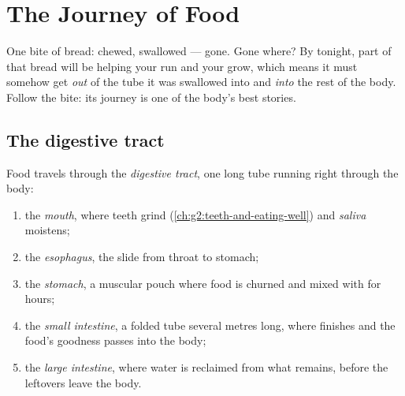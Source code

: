\chapter{The Journey of Food}\label{ch:g4:journey-of-food}

One bite of bread: chewed, swallowed --- gone. Gone where? By
tonight, part of that bread will be helping your  run and
your  grow, which means it must somehow get \emph{out} of
the tube it was swallowed into and \emph{into} the rest of the
body. Follow the bite: its journey is one of the body's best
stories.

\section{The digestive tract}

\begin{definition}\label{def:g4:journey-of-food:tract}
Food travels through the \emph{digestive
tract}, one long tube running right
through the body:
\begin{enumerate}
  \item the \emph{mouth}, where teeth grind
        (\cref{ch:g2:teeth-and-eating-well}) and
        \emph{saliva} moistens;
  \item the \emph{esophagus}, the slide from
        throat to stomach;
  \item the \emph{stomach}, a muscular pouch
        where food is churned and mixed with 
        for hours;
  \item the \emph{small intestine}, a
        folded tube several metres long, where 
        finishes and the food's goodness passes into the body;
  \item the \emph{large intestine},
        where water is reclaimed from what remains, before the
        leftovers leave the body.
\end{enumerate}
\end{definition}


